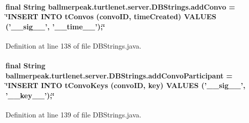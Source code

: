 \hypertarget{classballmerpeak_1_1turtlenet_1_1server_1_1DBStrings_ac332d75426a3fc552c1492ca1c14701c}{
\paragraph[{add\-Convo}]{\setlength{\rightskip}{0pt plus 5cm}final String ballmerpeak.\-turtlenet.\-server.\-D\-B\-Strings.\-add\-Convo = \char`\"{}I\-N\-S\-E\-R\-T I\-N\-T\-O t\-Convos (convo\-I\-D, time\-Created) V\-A\-L\-U\-E\-S ('\-\_\-\-\_\-sig\-\_\-\-\_\-', '\-\_\-\-\_\-time\-\_\-\-\_\-');\char`\"{}\hspace{0.3cm}{\ttfamily [static]}}}\label{classballmerpeak_1_1turtlenet_1_1server_1_1DBStrings_ac332d75426a3fc552c1492ca1c14701c}


Definition at line 138 of file D\-B\-Strings.\-java.

\hypertarget{classballmerpeak_1_1turtlenet_1_1server_1_1DBStrings_a2ef3257d6674eeb1d1eb0db4427eee3f}{
\paragraph[{add\-Convo\-Participant}]{\setlength{\rightskip}{0pt plus 5cm}final String ballmerpeak.\-turtlenet.\-server.\-D\-B\-Strings.\-add\-Convo\-Participant = \char`\"{}I\-N\-S\-E\-R\-T I\-N\-T\-O t\-Convo\-Keys (convo\-I\-D, key) V\-A\-L\-U\-E\-S ('\-\_\-\-\_\-sig\-\_\-\-\_\-', '\-\_\-\-\_\-key\-\_\-\-\_\-');\char`\"{}\hspace{0.3cm}{\ttfamily [static]}}}\label{classballmerpeak_1_1turtlenet_1_1server_1_1DBStrings_a2ef3257d6674eeb1d1eb0db4427eee3f}


Definition at line 139 of file D\-B\-Strings.\-java.

